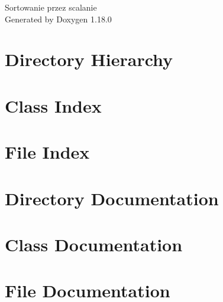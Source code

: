\documentclass[twoside]{book}
\newcommand{\+}{\discretionary{\mbox{\scriptsize$\hookleftarrow$}}{}{}}
\newcommand{\clearemptydoublepage}{%
    \newpage{\pagestyle{empty}\cleardoublepage}%
  }
\begin{document}
  \raggedbottom
    \hypersetup{pageanchor=false,
                bookmarksnumbered=true,
                pdfencoding=unicode
               }
  \begin{titlepage}
  \vspace*{7cm}
  \begin{center}%
  {\Large Sortowanie przez scalanie}\\
  \vspace*{1cm}
  {\large Generated by Doxygen 1.18.0}\\
  \end{center}
  \end{titlepage}
  \clearemptydoublepage
  \tableofcontents
  \clearemptydoublepage
  \hypersetup{pageanchor=true}
\chapter{Directory Hierarchy}

\chapter{Class Index}

\chapter{File Index}

\chapter{Directory Documentation}

\chapter{Class Documentation}

\chapter{File Documentation}




  \backmatter
  \newpage
  \clearemptydoublepage
  \printindex
\end{document}
